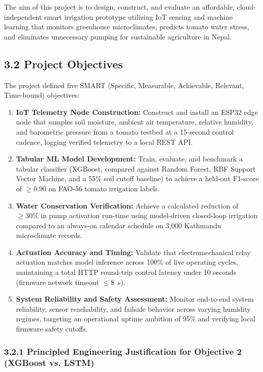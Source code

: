 \documentclass[12pt, a4paper]{article}
\begin{document}
The aim of this project is to design, construct, and evaluate an affordable, cloud-independent smart irrigation prototype utilizing IoT sensing and machine learning that monitors greenhouse microclimates, predicts tomato water stress, and eliminates unnecessary pumping for sustainable agriculture in Nepal.

\subsection{3.2 Project Objectives}
\label{sec:objectives}

The project defined five SMART (Specific, Measurable, Achievable, Relevant, Time-bound) objectives:

\begin{enumerate}[label=\textbf{Objective \arabic*:}, leftmargin=*, align=left, itemsep=4pt]
    \item \textbf{IoT Telemetry Node Construction:} Construct and install an ESP32 edge node that samples soil moisture, ambient air temperature, relative humidity, and barometric pressure from a tomato testbed at a 15-second control cadence, logging verified telemetry to a local REST API.
    \item \textbf{Tabular ML Model Development:} Train, evaluate, and benchmark a tabular classifier (XGBoost, compared against Random Forest, RBF Support Vector Machine, and a 55\% soil cutoff baseline) to achieve a held-out F1-score of $\ge 0.90$ on FAO-56 tomato irrigation labels.
    \item \textbf{Water Conservation Verification:} Achieve a calculated reduction of $\ge 30\%$ in pump activation run-time using model-driven closed-loop irrigation compared to an always-on calendar schedule on 3{,}000 Kathmandu microclimate records.
    \item \textbf{Actuation Accuracy and Timing:} Validate that electromechanical relay actuation matches model inference across 100\% of live operating cycles, maintaining a total HTTP round-trip control latency under 10 seconds (firmware network timeout $\le 8$~s).
    \item \textbf{System Reliability and Safety Assessment:} Monitor end-to-end system reliability, sensor reachability, and failsafe behavior across varying humidity regimes, targeting an operational uptime ambition of 95\% and verifying local firmware safety cutoffs.
\end{enumerate}

\subsubsection{3.2.1 Principled Engineering Justification for Objective 2 (XGBoost vs. LSTM)}
\label{sec:why-not-lstm}
\end{document}
